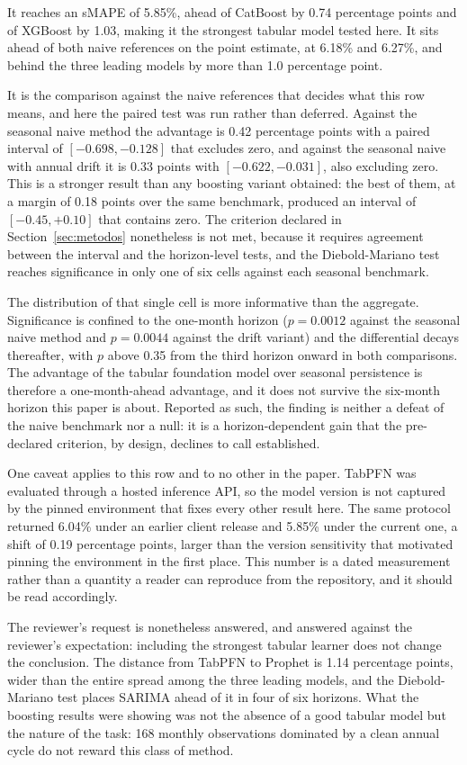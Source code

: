 It reaches an sMAPE of 5.85\%, ahead of CatBoost by 0.74 percentage points and of XGBoost by
1.03, making it the strongest tabular model tested here. It sits ahead of both naive
references on the point estimate, at 6.18\% and 6.27\%, and behind the three leading models
by more than 1.0 percentage point.

It is the comparison against the naive references that decides what this row means, and
here the paired test was run rather than deferred. Against the seasonal naive method the
advantage is 0.42 percentage points with a
paired interval of $[-0.698, -0.128]$ that excludes zero, and against the seasonal naive
with annual drift it is 0.33 points with $[-0.622, -0.031]$, also excluding zero. This is a
stronger result than any boosting variant obtained: the best of them, at a margin of 0.18
points over the same benchmark, produced an interval of $[-0.45, +0.10]$ that contains zero.
The criterion declared in Section~\ref{sec:metodos} nonetheless is not met, because it
requires agreement between the interval and the horizon-level tests, and the
Diebold-Mariano test reaches significance in only one of six cells against each seasonal
benchmark.

The distribution of that single cell is more informative than the aggregate. Significance
is confined to the one-month horizon ($p=0.0012$ against the seasonal naive method and
$p=0.0044$ against the drift variant) and the differential decays thereafter, with $p$
above 0.35 from the third horizon onward in both comparisons. The advantage of the tabular
foundation model over seasonal persistence is therefore a one-month-ahead advantage, and it
does not survive the six-month horizon this paper is about. Reported as such, the finding is
neither a defeat of the naive benchmark nor a null: it is a horizon-dependent gain that the
pre-declared criterion, by design, declines to call established.

One caveat applies to this row and to no other in the paper. TabPFN was evaluated through a
hosted inference API, so the model version is not captured by the pinned environment that
fixes every other result here. The same protocol returned 6.04\% under an earlier client
release and 5.85\% under the current one, a shift of 0.19 percentage points, larger than the
version sensitivity that motivated pinning the environment in the first place. This number
is a dated measurement rather than a quantity a reader can reproduce from the repository,
and it should be read accordingly.

The reviewer's request is nonetheless answered, and answered against the reviewer's
expectation: including the strongest tabular learner does not change the conclusion. The
distance from TabPFN to Prophet is 1.14 percentage points, wider than the entire spread
among the three leading models, and the Diebold-Mariano test places SARIMA ahead of it in
four of six horizons. What the boosting results were showing was not the absence
of a good tabular model but the nature of the task: 168 monthly observations dominated by a
clean annual cycle do not reward this class of method.

